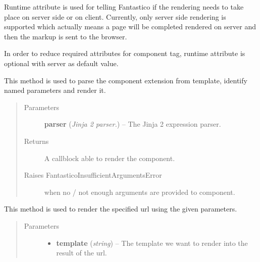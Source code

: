 \documentclass[letterpaper,10pt,english]{sphinxmanual}
\begin{document}
\begin{fulllineitems}
Runtime attribute is used for telling Fantastico if the rendering needs to take place on server side or on client. Currently,
only server side rendering is supported which actually means a page will be completed rendered on server and then the markup
is sent to the browser.

In order to reduce required attributes for component tag, runtime attribute is optional with server as default value.

\begin{fulllineitems}
\label{features/component_reusage:fantastico.rendering.component.Component.parse}
This method is used to parse the component extension from template, identify named parameters and render it.
\begin{quote}\begin{description}
\item[{Parameters}] \leavevmode
\textbf{parser} (\emph{Jinja 2 parser.}) -- The Jinja 2 expression parser.

\item[{Returns}] \leavevmode
A callblock able to render the component.

\item[{Raises FantasticoInsufficientArgumentsError}] \leavevmode
when no / not enough arguments are provided to component.

\end{description}\end{quote}

\end{fulllineitems}


\begin{fulllineitems}
\label{features/component_reusage:fantastico.rendering.component.Component.render}
This method is used to render the specified url using the given parameters.
\begin{quote}\begin{description}
\item[{Parameters}] \leavevmode\begin{itemize}
\item {} 
\textbf{template} (\emph{string}) -- The template we want to render into the result of the url.


\end{itemize}
\end{description}
\end{quote}
\end{fulllineitems}
\end{fulllineitems}
\end{document}
